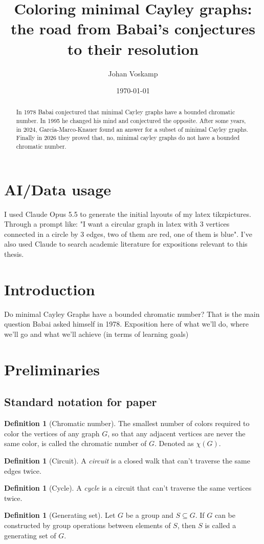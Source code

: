 \documentclass[a4paper,10pt]{article}
\title{Coloring minimal Cayley graphs: the road from Babai's conjectures to their resolution}
\author{Johan Voskamp}
\date{\today}
\numberwithin{equation}{section}
\theoremstyle{definition}
\newtheorem{definition}[theorem]{Definition}
\begin{document}
\maketitle

\begin{abstract}
    In 1978 Babai conjectured that minimal Cayley graphs have a bounded chromatic number. In 1995 he changed his mind and conjectured the opposite. After some years, in 2024, Garcia-Marco-Knauer found an answer for a subset of minimal Cayley graphs. Finally in 2026 they proved that, no, minimal cayley graphs do not have a bounded chromatic number.
\end{abstract}
\section{AI/Data usage}
    I used Claude Opus 5.5 to generate the initial layouts of my latex tikzpictures. Through a prompt like:
    "I want a circular graph in latex with 3 vertices connected in a circle by 3 edges, two of them are red, one of them is blue". I've also used Claude to search academic literature for expositions relevant to this thesis.
\section{Introduction}
    Do minimal Cayley Graphs have a bounded chromatic number? That is the main question Babai asked himself in 1978.
    Exposition here of what we'll do, where we'll go and what we'll achieve (in terms of learning goals)
\section{Preliminaries}
\subsection{Standard notation for paper}
\begin{definition}[Chromatic number]\label{chromatic}\cite{west}
        The smallest number of colors required to color the vertices of any graph \(G\), so that any adjacent vertices are never the same color, is called the chromatic number of  \(G\). Denoted as \(\chi(G)\).
    \end{definition}
    \begin{definition}[Circuit]\label{circuit}\cite{west}
        A \emph{circuit} is a closed walk that can't traverse the same edges twice.
    \end{definition}
    \begin{definition}[Cycle]\label{cycle}\cite{west}
        A \emph{cycle} is a circuit that can't traverse the same vertices twice.
    \end{definition}
    \begin{definition}[Generating set]
        Let \(G\) be a group and \(S\subseteq G\). If \(G\) can be constructed by group operations between elements of \(S\), then \(S\) is called a generating set of \(G\).
    \end{definition}
\end{document}
